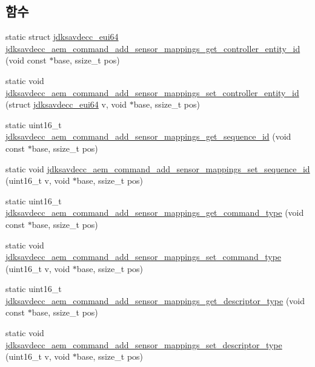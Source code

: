 \subsection*{함수}
\begin{DoxyCompactItemize}
\item 
static struct \hyperlink{structjdksavdecc__eui64}{jdksavdecc\+\_\+eui64} \hyperlink{group__command__add__sensor__mappings_ga82799df0bfdd6741a4cc692f2474c74a}{jdksavdecc\+\_\+aem\+\_\+command\+\_\+add\+\_\+sensor\+\_\+mappings\+\_\+get\+\_\+controller\+\_\+entity\+\_\+id} (void const $\ast$base, ssize\+\_\+t pos)
\item 
static void \hyperlink{group__command__add__sensor__mappings_gac1e81a6b7f2c5188dc2fe2e8679f5e2c}{jdksavdecc\+\_\+aem\+\_\+command\+\_\+add\+\_\+sensor\+\_\+mappings\+\_\+set\+\_\+controller\+\_\+entity\+\_\+id} (struct \hyperlink{structjdksavdecc__eui64}{jdksavdecc\+\_\+eui64} v, void $\ast$base, ssize\+\_\+t pos)
\item 
static uint16\+\_\+t \hyperlink{group__command__add__sensor__mappings_ga23e05212aaffa3e90331c9d8ce95a590}{jdksavdecc\+\_\+aem\+\_\+command\+\_\+add\+\_\+sensor\+\_\+mappings\+\_\+get\+\_\+sequence\+\_\+id} (void const $\ast$base, ssize\+\_\+t pos)
\item 
static void \hyperlink{group__command__add__sensor__mappings_gaf15d198c567195cf703775b1f24493eb}{jdksavdecc\+\_\+aem\+\_\+command\+\_\+add\+\_\+sensor\+\_\+mappings\+\_\+set\+\_\+sequence\+\_\+id} (uint16\+\_\+t v, void $\ast$base, ssize\+\_\+t pos)
\item 
static uint16\+\_\+t \hyperlink{group__command__add__sensor__mappings_gaa16862526e5df08b4718e16b0caf78a6}{jdksavdecc\+\_\+aem\+\_\+command\+\_\+add\+\_\+sensor\+\_\+mappings\+\_\+get\+\_\+command\+\_\+type} (void const $\ast$base, ssize\+\_\+t pos)
\item 
static void \hyperlink{group__command__add__sensor__mappings_ga210ac2ef22d366a3b6e5bc2a883fcf9c}{jdksavdecc\+\_\+aem\+\_\+command\+\_\+add\+\_\+sensor\+\_\+mappings\+\_\+set\+\_\+command\+\_\+type} (uint16\+\_\+t v, void $\ast$base, ssize\+\_\+t pos)
\item 
static uint16\+\_\+t \hyperlink{group__command__add__sensor__mappings_ga8410075024ae127094c18ebbbf35748b}{jdksavdecc\+\_\+aem\+\_\+command\+\_\+add\+\_\+sensor\+\_\+mappings\+\_\+get\+\_\+descriptor\+\_\+type} (void const $\ast$base, ssize\+\_\+t pos)
\item 
static void \hyperlink{group__command__add__sensor__mappings_gaf60ec191c32be65a7dcbc286ec48cc77}{jdksavdecc\+\_\+aem\+\_\+command\+\_\+add\+\_\+sensor\+\_\+mappings\+\_\+set\+\_\+descriptor\+\_\+type} (uint16\+\_\+t v, void $\ast$base, ssize\+\_\+t pos)

\end{DoxyCompactItemize}
